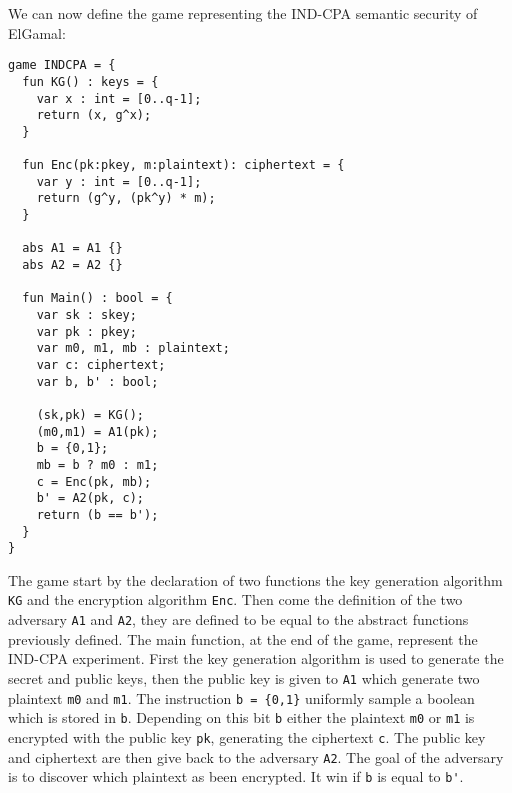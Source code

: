 We can now define the game representing the IND-CPA semantic security of ElGamal:
\begin{verbatim}
game INDCPA = {
  fun KG() : keys = {
    var x : int = [0..q-1];
    return (x, g^x);
  }

  fun Enc(pk:pkey, m:plaintext): ciphertext = {
    var y : int = [0..q-1];
    return (g^y, (pk^y) * m);
  }

  abs A1 = A1 {}
  abs A2 = A2 {}
  
  fun Main() : bool = {
    var sk : skey;
    var pk : pkey;
    var m0, m1, mb : plaintext;
    var c: ciphertext;
    var b, b' : bool;

    (sk,pk) = KG();
    (m0,m1) = A1(pk);
    b = {0,1};
    mb = b ? m0 : m1;
    c = Enc(pk, mb);
    b' = A2(pk, c);
    return (b == b');
  } 
}      
\end{verbatim}
The game start by the declaration of two functions the key generation
algorithm \verb+KG+ and the encryption algorithm \verb+Enc+. Then come
the definition of the two adversary \verb+A1+ and \verb+A2+, they are
defined to be equal to the abstract functions previously defined.
The main function, at the end of the game, represent the IND-CPA experiment.
First the key generation algorithm is used to generate the secret and public
keys, then the public key is given to \verb+A1+ which generate two plaintext
\verb+m0+ and \verb+m1+. The instruction \verb+b = {0,1}+ uniformly sample a
boolean which is stored in \verb+b+. Depending on this bit \verb+b+
either the plaintext \verb+m0+ or \verb+m1+ is encrypted with the
public key \verb+pk+, generating the ciphertext \verb+c+. The public key and 
ciphertext are then give back to the adversary \verb+A2+. The goal of the
adversary is to discover which plaintext as been encrypted. It win if
\verb+b+ is equal to \verb+b'+.

